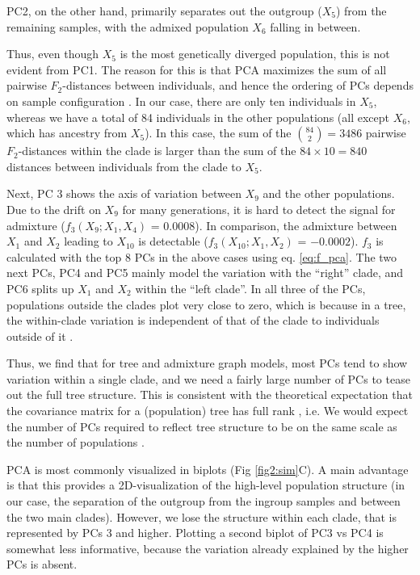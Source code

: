 \documentclass[12pt]{article}
\begin{document}
PC2, on the other hand, primarily separates out the outgroup ($X_5$) from the remaining samples, with the admixed population $X_6$ falling in between.

Thus, even though $X_5$ is the most genetically diverged population, this is not evident from PC1. The reason for this is that PCA maximizes the sum of all pairwise $F_2$-distances between individuals, and hence the ordering of PCs depends on sample configuration \citep{mcvean_genealogical_2009, elhaik_principal_2022}. In our case, there are only ten individuals in $X_5$, whereas we have a total of 84 individuals in the other populations (all except $X_6$, which has ancestry from $X_5$). In this case, the sum of the $\binom{84}{2}=3486$ pairwise $F_2$-distances within the clade is larger than the sum of the $84 \times 10 = 840$ distances between individuals from the clade to $X_5$. 

Next, PC 3 shows the axis of variation between $X_9$ and the other populations. Due to the drift on $X_9$ for many generations, it is hard to detect the signal for admixture ($f_3(X_9; X_1, X_4)$ = $0.0008$). In comparison, the admixture between $X_1$ and $X_2$ leading to $X_{10}$ is detectable ($f_3(X_{10}; X_1, X_2)$ = $-0.0002$). $f_3$ is calculated with the top 8 PCs in the above cases using eq. \ref{eq:f_pca}. The two next PCs, PC4 and PC5 mainly model the variation with the ``right'' clade, and PC6 splits up $X_1$ and $X_2$ within the ``left clade''. In all three of the PCs, populations outside the clades plot very close to zero, which is because in a tree, the within-clade variation is independent of that of the clade to individuals outside of it \citep{felsenstein_maximum-likelihood_1973}. 

Thus, we find that for tree and admixture graph models, most PCs tend to show variation within a single clade, and we need a fairly large number of PCs to tease out the full tree structure. This is consistent with the theoretical expectation that the covariance matrix for a (population) tree has full rank \citep{felsenstein_maximum-likelihood_1973}, i.e. We would expect the number of PCs required to reflect tree structure to be on the same scale as the number of populations \citep{patterson_population_2006}. 

PCA is most commonly visualized in biplots (Fig \ref{fig2:sim}C). A main advantage is that this provides a 2D-visualization of the high-level population structure (in our case, the separation of the outgroup from the ingroup samples and between the two main clades). However, we lose the structure within each clade, that is represented by PCs 3 and higher. Plotting a second biplot of PC3 vs PC4 is somewhat less informative, because the variation already explained by the higher PCs is absent.
\end{document}
